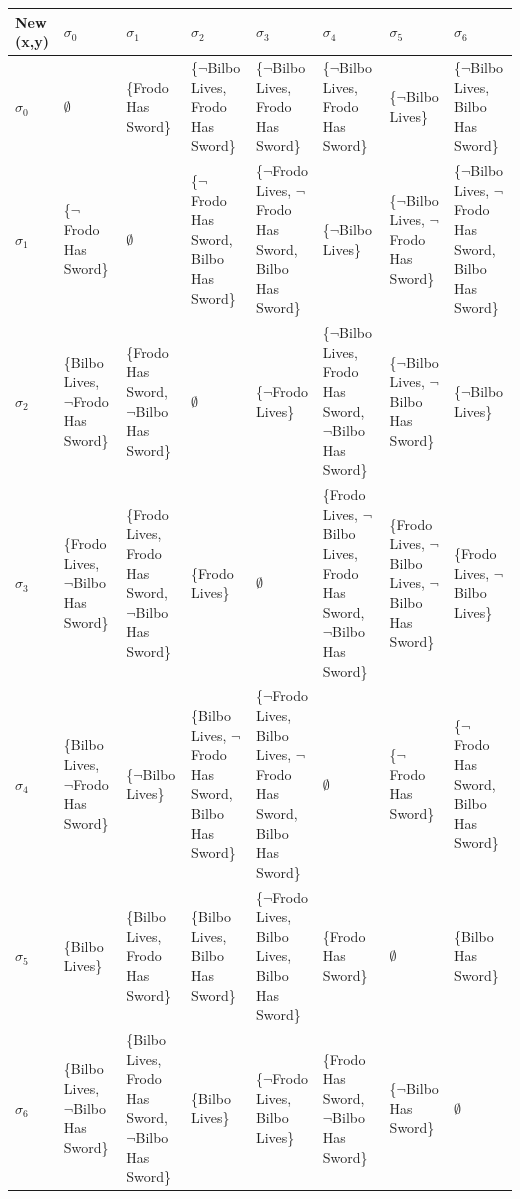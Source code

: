 \documentclass[11pt,a4paper]{article}
\begin{document}
\begin{table}[]
	\centering
	\label{my-label}
	\caption{$New$}
\begin{longtable}{|p{1cm}|p{1.9cm}|p{1.9cm}|p{1.9cm}|p{1.9cm}|p{1.9cm}|p{1.9cm}|p{1.9cm}|}
\hline
 New (x,y)    & $\sigma_0$  & $\sigma_1$ & $\sigma_2$ & $\sigma_3$ & $\sigma_4$ & $\sigma_5$ & $\sigma_6$ \\ \hline
	 $\sigma_0$ & $\emptyset$  & \{Frodo Has Sword\} & \{$\neg$Bilbo Lives, Frodo Has Sword\} & \{$\neg$Bilbo Lives, Frodo Has Sword\} & \{$\neg$Bilbo Lives, Frodo Has Sword\} & \{$\neg$Bilbo Lives\} & \{$\neg$Bilbo Lives, Bilbo Has Sword\} \\ \hline
	 
     $\sigma_1$ &  \{$\neg$Frodo Has Sword\} & $\emptyset$ & \{$\neg$Frodo Has Sword, Bilbo Has Sword\}  & \{$\neg$Frodo Lives, $\neg$Frodo Has Sword, Bilbo Has Sword\}  & \{$\neg$Bilbo Lives\} & \{$\neg$Bilbo Lives, $\neg$Frodo  Has Sword\} & \{$\neg$Bilbo Lives, $\neg$Frodo Has Sword, Bilbo Has Sword\}\\ \hline
     
     $\sigma_2$ &  \{Bilbo Lives, $\neg$Frodo Has Sword\}  & \{Frodo Has Sword, $\neg$Bilbo Has Sword\} & $\emptyset$ & \{$\neg$Frodo Lives\} & \{$\neg$Bilbo Lives, Frodo Has Sword, $\neg$Bilbo Has Sword\} & \{$\neg$Bilbo Lives, $\neg$Bilbo Has Sword\} & \{$\neg$Bilbo Lives\}\\ \hline
     
     $\sigma_3$ &  \{Frodo Lives, $\neg$Bilbo Has Sword\}  & \{Frodo Lives, Frodo Has Sword, $\neg$Bilbo Has Sword\} & \{Frodo Lives\} &  $\emptyset$ & \{Frodo Lives, $\neg$Bilbo Lives, Frodo Has Sword, $\neg$Bilbo Has Sword\} & \{Frodo Lives, $\neg$Bilbo Lives, $\neg$Bilbo Has Sword\} & \{Frodo Lives, $\neg$Bilbo Lives\} \\ \hline
     
     $\sigma_4$ &  \{Bilbo Lives, $\neg$Frodo Has Sword\}  & \{$\neg$Bilbo Lives\} & \{Bilbo Lives, $\neg$Frodo Has Sword, Bilbo Has Sword\} & \{$\neg$Frodo Lives, Bilbo Lives, $\neg$Frodo Has Sword, Bilbo Has Sword\} & $\emptyset$ &\{$\neg$Frodo Has Sword\} & \{$\neg$Frodo Has Sword, Bilbo Has Sword\}  \\ \hline
     
     $\sigma_5$ &  \{Bilbo Lives\}  & \{Bilbo Lives, Frodo Has Sword\} & \{Bilbo Lives, Bilbo Has Sword\} & \{$\neg$Frodo Lives, Bilbo Lives, Bilbo Has Sword\} & \{Frodo Has Sword\} & $\emptyset$ & \{Bilbo Has Sword\} \\ \hline
     
     $\sigma_6$ &  \{Bilbo Lives, $\neg$Bilbo Has Sword\} & \{Bilbo Lives, Frodo Has Sword, $\neg$Bilbo Has Sword\} & \{Bilbo Lives\} & \{$\neg$Frodo Lives, Bilbo Lives\} & \{Frodo Has Sword, $\neg$Bilbo Has Sword\} & \{$\neg$Bilbo Has Sword\} & $\emptyset$\\ \hline
\end{longtable}
\end{table}
 
\end{document}
